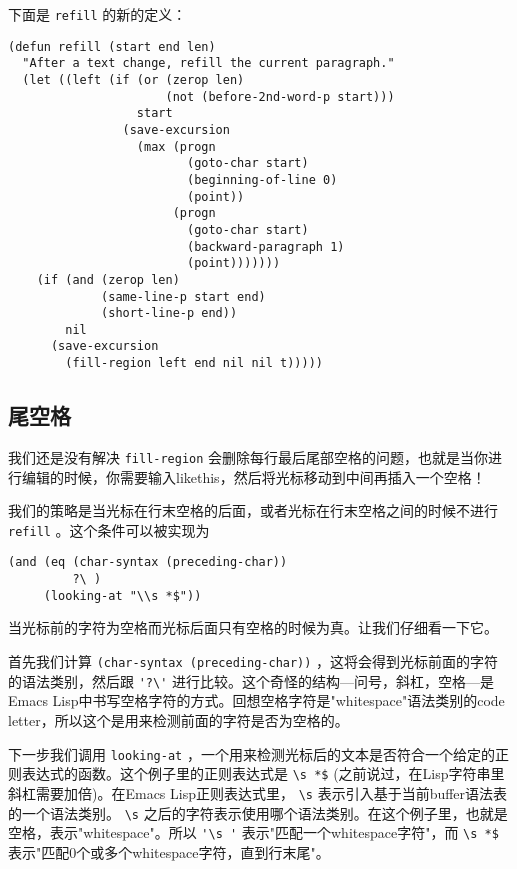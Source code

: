 下面是 \texttt{refill} 的新的定义：

\begin{verbatim}
(defun refill (start end len)
  "After a text change, refill the current paragraph."
  (let ((left (if (or (zerop len)
                      (not (before-2nd-word-p start)))
                  start
                (save-excursion
                  (max (progn
                         (goto-char start)
                         (beginning-of-line 0)
                         (point))
                       (progn
                         (goto-char start)
                         (backward-paragraph 1)
                         (point)))))))
    (if (and (zerop len)
             (same-line-p start end)
             (short-line-p end))
        nil
      (save-excursion
        (fill-region left end nil nil t)))))
\end{verbatim}

\subsection{尾空格}
\label{section:07-Trailing-Whitespace}

我们还是没有解决 \texttt{fill-region} 会删除每行最后尾部空格的问题，也就是当你进行编辑的时候，你需要输入likethis，然后将光标移动到中间再插入一个空格！

我们的策略是当光标在行末空格的后面，或者光标在行末空格之间的时候不进行 \texttt{refill} 。这个条件可以被实现为

\begin{verbatim}
(and (eq (char-syntax (preceding-char))
         ?\ )
     (looking-at "\\s *$"))
\end{verbatim}

当光标前的字符为空格而光标后面只有空格的时候为真。让我们仔细看一下它。

首先我们计算 \texttt{(char-syntax (preceding-char))} ，这将会得到光标前面的字符的语法类别，然后跟 \verb|'?\'| 进行比较。这个奇怪的结构---问号，斜杠，空格---是Emacs Lisp中书写空格字符的方式。回想空格字符是"whitespace"语法类别的code letter，所以这个是用来检测前面的字符是否为空格的。

下一步我们调用 \texttt{looking-at} ，一个用来检测光标后的文本是否符合一个给定的正则表达式的函数。这个例子里的正则表达式是 \verb|\s *$| (之前说过，在Lisp字符串里斜杠需要加倍)。在Emacs Lisp正则表达式里， \verb|\s| 表示引入基于当前buffer语法表的一个语法类别。 \verb|\s| 之后的字符表示使用哪个语法类别。在这个例子里，也就是空格，表示"whitespace"。所以 \verb|'\s '| 表示"匹配一个whitespace字符"，而 \verb|\s *$| 表示"匹配0个或多个whitespace字符，直到行末尾"。

